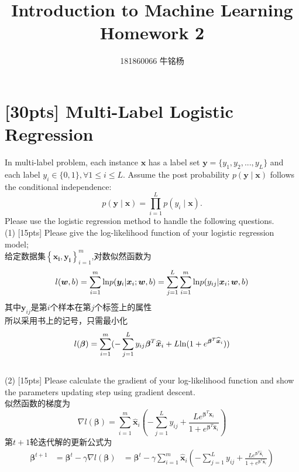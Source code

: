 \documentclass{article}
\title{Introduction to Machine Learning\\Homework 2}
\author{181860066 牛铭杨}
\begin{document}
	\maketitle
	\section{[30pts] Multi-Label Logistic Regression}
    In multi-label problem, each instance $\bm{x}$ has a label set $\bm{y}=\{y_1,y_2,...,y_L\}$ and each label $y_i\in\{0,1\}, \forall 1 \leq i \leq L$. Assume the post probability $p(\bm{y} \mid \bm{x})$ follows the conditional independence:\\
    \begin{equation}
    p(\bm{y} \mid \bm{x})=\prod\limits_{i=1}^L p(y_i \mid \bm{x}).
    \end{equation}
    Please use the logistic regression method to handle the following questions.\\
    (1) [15pts] Please give the log-likelihood function of your logistic regression model;\\
        给定数据集$\left\{\bm{x_i}, \bm{y_i}\right\}_{i=1}^m$,对数似然函数为
        \begin{equation}
            l({\bm w}, b) = \sum_{i=1}^m {\rm ln} p({\bm y_i}|{\bm x_i};{\bm w},b)
                         = \sum_{j=1}^L \sum_{i=1}^m {\rm ln} p({y_{ij}}|{\bm x_i};{\bm w},b)
        \end{equation}
        其中${\bm y_{ij}}$是第$i$个样本在第$j$个标签上的属性\\
        所以采用书上的记号，只需最小化
        \begin{equation}
            l({\bm \beta}) = \sum_{i=1}^m (-\sum_{j=1}^L y_{ij} {\bm \beta^T} {{\bm {\widehat x}_i}}
            +L{\rm ln}(1+e^{{\bm \beta^T} {{\bm {\widehat x}_i}}}))
        \end{equation}\\
    
    (2) [15pts] Please calculate the gradient of your log-likelihood function and show the parameters updating step using gradient descent.\\
    似然函数的梯度为
    \begin{equation}
        \nabla l({\bm \beta}) = \sum_{i=1}^m {{\bm {\widehat x}_i}} (-\sum_{j=1}^L y_{ij}
        +\frac{Le^{{\bm \beta^T}{{\bm {\widehat x}_i}}}}{1+e^{{\bm \beta^T}{{\bm {\widehat x}_i}}}})
    \end{equation}
    第$t+1$轮迭代解的更新公式为
    \begin{equation}
        \begin{aligned}
            {\bm \beta}^{t+1}&={\bm \beta}^t-\gamma \nabla l({\bm \beta})
            &={\bm \beta}^t-\gamma \sum_{i=1}^m {{\bm {\widehat x}_i}} (-\sum_{j=1}^L y_{ij}
            +\frac{Le^{{\bm \beta^T}{{\bm {\widehat x}_i}}}}{1+e^{{\bm \beta^T}{{\bm {\widehat x}_i}}}})
        \end{aligned}
    \end{equation}
    
\end{document}

